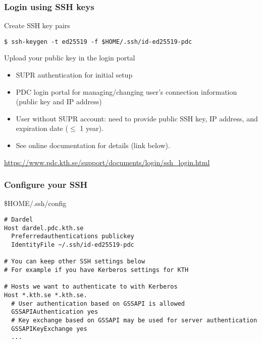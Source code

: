 \begin{frame}[fragile]
\frametitle{Login using SSH keys}

\begin{block}{Create SSH key pairs}
\begin{verbatim}
$ ssh-keygen -t ed25519 -f $HOME/.ssh/id-ed25519-pdc
\end{verbatim}
\end{block}

\begin{block}{Upload your public key in the login portal}
    \begin{itemize}
        \item SUPR authentication for initial setup
        \item PDC login portal for managing/changing user’s connection information (public key and IP address)
        \item User without SUPR account: need to provide public SSH key, IP address, and expiration date ($\le$ 1 year).
        \item See online documentation for details (link below).
    \end{itemize}
\end{block}

\href{https://www.pdc.kth.se/support/documents/login/ssh\_login.html}{https://www.pdc.kth.se/support/documents/login/ssh\_login.html}

\end{frame}


\begin{frame}[fragile]
\frametitle{Configure your SSH}

\begin{block}{\$HOME/.ssh/config}
\footnotesize
\begin{verbatim}
# Dardel
Host dardel.pdc.kth.se
  Preferredauthentications publickey
  IdentityFile ~/.ssh/id-ed25519-pdc

# You can keep other SSH settings below
# For example if you have Kerberos settings for KTH

# Hosts we want to authenticate to with Kerberos
Host *.kth.se *.kth.se.
  # User authentication based on GSSAPI is allowed
  GSSAPIAuthentication yes
  # Key exchange based on GSSAPI may be used for server authentication
  GSSAPIKeyExchange yes
  ...
\end{verbatim}
\end{block}

\end{frame}

